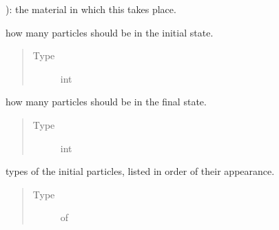 \documentclass[letterpaper,10pt,english]{sphinxmanual}
\begin{document}
\begin{fulllineitems}
\begin{fulllineitems}
\begin{quote}
\begin{description}
\end{description}\end{quote}

\end{fulllineitems}



\begin{fulllineitems}
): the material in which this takes place.

\end{fulllineitems}


\begin{fulllineitems}
\label{\detokenize{code_structure:scdc.interaction.Interaction.n_initial}}
how many particles should be in the initial state.
\begin{quote}\begin{description}
\item[{Type}] \leavevmode
int

\end{description}\end{quote}

\end{fulllineitems}


\begin{fulllineitems}
\label{\detokenize{code_structure:scdc.interaction.Interaction.n_final}}
how many particles should be in the final state.
\begin{quote}\begin{description}
\item[{Type}] \leavevmode
int

\end{description}\end{quote}

\end{fulllineitems}


\begin{fulllineitems}
\label{\detokenize{code_structure:scdc.interaction.Interaction.initial}}
types of the initial particles,
listed in order of their appearance.
\begin{quote}\begin{description}
\item[{Type}] \leavevmode
{} of 


\end{description}
\end{quote}
\end{fulllineitems}
\end{fulllineitems}
\end{document}
